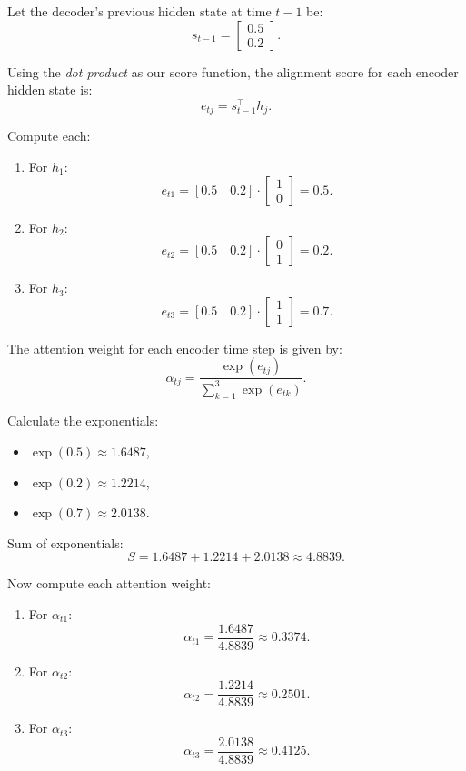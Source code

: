 Let the decoder’s previous hidden state at time \( t-1 \) be:
\[
s_{t-1} = \begin{bmatrix} 0.5 \\ 0.2 \end{bmatrix}.
\]

Using the \textit{dot product} as our score function, the alignment score for each encoder hidden state is:
\[
e_{tj} = s_{t-1}^\top h_j.
\]

Compute each:
\begin{enumerate}
	\item  For \( h_1 \):
   \[
   e_{t1} = [0.5 \quad 0.2] \cdot \begin{bmatrix} 1 \\ 0 \end{bmatrix} = 0.5.
   \]
\item For \( h_2 \):
   \[
   e_{t2} = [0.5 \quad 0.2] \cdot \begin{bmatrix} 0 \\ 1 \end{bmatrix} = 0.2.
   \]
\item For \( h_3 \):
   \[
   e_{t3} = [0.5 \quad 0.2] \cdot \begin{bmatrix} 1 \\ 1 \end{bmatrix} = 0.7.
   \]
\end{enumerate}

The attention weight for each encoder time step is given by:
\[
\alpha_{tj} = \frac{\exp(e_{tj})}{\sum_{k=1}^{3} \exp(e_{tk})}.
\]

Calculate the exponentials:
\begin{itemize}
	\item \(\exp(0.5) \approx 1.6487\),
	\item \(\exp(0.2) \approx 1.2214\),
	\item \(\exp(0.7) \approx 2.0138\).
\end{itemize}

Sum of exponentials:
\[
S = 1.6487 + 1.2214 + 2.0138 \approx 4.8839.
\]

Now compute each attention weight:
\begin{enumerate}
	\item For \( \alpha_{t1} \):
   \[
   \alpha_{t1} = \frac{1.6487}{4.8839} \approx 0.3374.
   \]
\item For \( \alpha_{t2} \):
   \[
   \alpha_{t2} = \frac{1.2214}{4.8839} \approx 0.2501.
   \]
\item For \( \alpha_{t3} \):
   \[
   \alpha_{t3} = \frac{2.0138}{4.8839} \approx 0.4125.
   \]
\end{enumerate}

